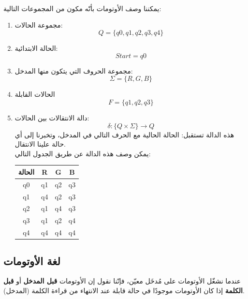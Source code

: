 \documentclass[12pt]{article}
\begin{document}
يمكننا وصف الأوتومات بأنّه مكون من المجموعات التالية:

\begin{enumerate}
    \item مجموعة الحالات:
    $$Q = \{q0, q1, q2, q3, q4\}$$

    \item الحالة الابتدائية:
    $$Start = q0$$

    \item مجموعة الحروف التي يتكون منها المدخل:
    $$ \Sigma = \{R,G,B\}$$

    \item الحالات القابلة
    $$ F = \{q1, q2, q3\}$$

    \item دالة الانتقالات بين الحالات:
    $$\delta: \{Q \times \Sigma \} \to Q$$
    هذه الدالة تستقبل: الحالة الحالية مع الحرف التالي في المدخل، وتخبرنا إلى أي حالة علينا الانتقال. \\
    يمكن وصف هذه الدالة عن طريق الجدول التالي:
    \begin{table}[h]
    \centering
    \begin{tabular}{|c|c|c|c|}
    \hline
    \textbf{الحالة} & \textbf{R} & \textbf{G} & \textbf{B} \\
    \hline
    \textenglish{q0} & \textenglish{q1} & \textenglish{q2} & \textenglish{q3} \\
    \hline
    \textenglish{q1} & \textenglish{q4} & \textenglish{q2} & \textenglish{q3} \\
    \hline
    \textenglish{q2} & \textenglish{q1} & \textenglish{q4} & \textenglish{q3} \\
    \hline
    \textenglish{q3} & \textenglish{q1} & \textenglish{q2} & \textenglish{q4} \\
    \hline
    \textenglish{q4} & \textenglish{q4} & \textenglish{q4} & \textenglish{q4} \\
    \hline
    \end{tabular}
    \end{table}
\end{enumerate}

\subsection{لغة الأوتومات}

عندما نشغّل الأوتومات على مُدخَل معيّن، فإنّنا نقول إن الأوتومات \textbf{قبل المدخل} أو \textbf{قبل الكلمة} إذا كان الأوتومات موجودًا في حالة قابلة عند الانتهاء من قراءة الكلمة (المدخل).
\end{document}
